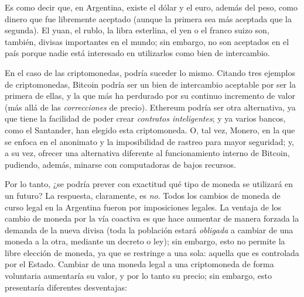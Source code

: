 \documentclass[12pt,a4paper,twoside]{book}
\begin{document}
Es como decir que, en Argentina, existe el dólar y el euro, además del peso, como dinero que fue libremente aceptado (aunque la primera sea más aceptada que la segunda). El yuan, el rublo, la libra esterlina, el yen o el franco suizo son, también, divisas importantes en el mundo; sin embargo, no son aceptados en el país porque nadie está interesado en utilizarlos como bien de intercambio.

En el caso de las criptomonedas, podría suceder lo mismo. Citando tres ejemplos de criptomonedas, Bitcoin podría ser un bien de intercambio aceptable por ser la primera de ellas, y la que más ha perdurado por su continuo incremento de valor (más allá de las \textit{correcciones} de precio). Ethereum podría ser otra alternativa, ya que tiene la facilidad de poder crear \textit{contratos inteligentes}; y ya varios bancos, como el Santander, han elegido esta criptomoneda. O, tal vez, Monero, en la que se enfoca en el anonimato y la imposibilidad de rastreo para mayor seguridad; y, a su vez, ofrecer una alternativa diferente al funcionamiento interno de Bitcoin, pudiendo, además, minarse con computadoras de bajos recursos.

Por lo tanto, ¿se podría prever con exactitud qué tipo de moneda se utilizará en un futuro? La respuesta, claramente, es \textit{no}. Todos los cambios de moneda de curso legal en la Argentina fueron por imposiciones legales. La ventaja de los cambio de moneda por la vía coactiva es que hace aumentar de manera forzada la demanda de la nueva divisa (toda la población estará \textit{obligada} a cambiar de una moneda a la otra, mediante un decreto o ley); sin embargo, esto no permite la libre elección de moneda, ya que se restringe a una sola: aquella que es controlada por el Estado. Cambiar de una moneda legal a una criptomoneda de forma voluntaria aumentaría su valor, y por lo tanto su precio; sin embargo, esto presentaría diferentes desventajas:
\end{document}

